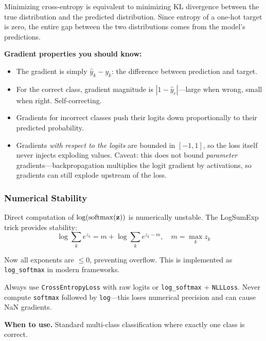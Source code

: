 \begin{keyinsight}
Minimizing cross-entropy is equivalent to minimizing KL divergence between the true distribution and the predicted distribution. Since entropy of a one-hot target is zero, the entire gap between the two distributions comes from the model's predictions.
\end{keyinsight}

\textbf{Gradient properties you should know:}
\begin{itemize}
    \item The gradient is simply $\hat{y}_k - y_k$: the difference between prediction and target.
    \item For the correct class, gradient magnitude is $|1 - \hat{y}_c|$---large when wrong, small when right. Self-correcting.
    \item Gradients for incorrect classes push their logits down proportionally to their predicted probability.
    \item Gradients \textit{with respect to the logits} are bounded in $[-1, 1]$, so the loss itself never injects exploding values. Caveat: this does not bound \textit{parameter} gradients---backpropagation multiplies the logit gradient by activations, so gradients can still explode upstream of the loss.
\end{itemize}

\subsubsection{Numerical Stability}

Direct computation of $\log(\operatorname{softmax}(\mathbf{z}))$ is numerically unstable. The LogSumExp trick provides stability:
\begin{equation}
\log\sum_k e^{z_k} = m + \log\sum_k e^{z_k - m}, \quad m = \max_k z_k
\end{equation}

Now all exponents are $\leq 0$, preventing overflow. This is implemented as \texttt{log\_softmax} in modern frameworks.

\begin{warningbox}
Always use \texttt{CrossEntropyLoss} with raw logits or \texttt{log\_softmax} + \texttt{NLLLoss}. Never compute \texttt{softmax} followed by \texttt{log}---this loses numerical precision and can cause NaN gradients.
\end{warningbox}

\textbf{When to use.} Standard multi-class classification where exactly one class is correct.

